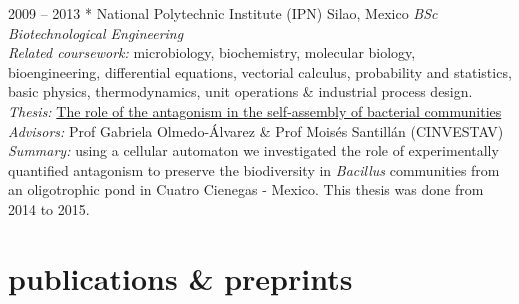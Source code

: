 \documentclass[]{friggeri-cv} %
\begin{document}
\begin{entrylist}
\entry
{2009 -- 2013}
{}
{* National Polytechnic Institute (IPN)}
{Silao, Mexico}
{{\normalsize\emph{BSc {\normalfont Biotechnological Engineering}} \\} \emph{Related coursework:} microbiology, biochemistry, molecular biology, bioengineering, differential equations, vectorial calculus, probability and statistics, basic physics, thermodynamics, unit operations \& industrial process design.}
{\emph{Thesis:} \href{https://github.com/romanzapien/bsc_thesis/blob/main/BScThesis_RomanZapienCampos.pdf}{The role of the antagonism in the self-assembly of bacterial communities} \\ \emph{Advisors:} Prof Gabriela Olmedo-Álvarez \& Prof Moisés Santillán (CINVESTAV) \\ \emph{Summary:} using a cellular automaton we investigated the role of experimentally quantified antagonism to preserve the biodiversity in \textit{Bacillus} communities from an oligotrophic pond in Cuatro Cienegas - Mexico. This thesis was done from 2014 to 2015.}
\end{entrylist}


\section{publications \& preprints}
\end{document}

